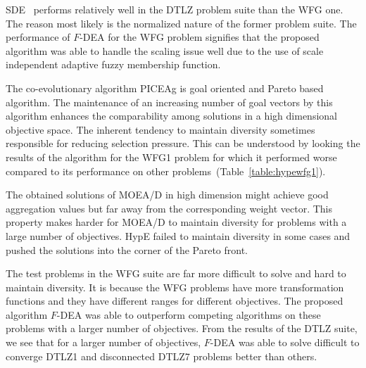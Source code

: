 \documentclass[review]{elsarticle}
\begin{document}
SDE~\citep{sdealgorithm} performs relatively well in the DTLZ problem suite than the WFG one. The reason most likely is the normalized nature of 
the former problem suite. 
The performance of $F$-DEA for the WFG problem signifies that the proposed algorithm was able to handle the scaling 
issue well due to the use of scale independent adaptive fuzzy membership function.

The co-evolutionary algorithm PICEAg is goal oriented and Pareto based algorithm. The maintenance of an increasing number of goal vectors
by this algorithm enhances the comparability among solutions in a high dimensional objective space. 
The inherent tendency to maintain diversity sometimes responsible for reducing selection pressure.
This can be understood by looking the results of the algorithm for the WFG1 problem for which it performed worse
compared to its performance on other problems~(Table~\ref{table:hypewfg1}).

The obtained solutions of MOEA/D in high dimension might achieve good aggregation values but far away from the corresponding weight vector. This property makes harder for MOEA/D to maintain diversity for problems with a large number of objectives. 
HypE failed to maintain diversity in some cases and pushed the solutions into the corner of the Pareto front.

The test problems in the WFG suite are far more difficult to solve and hard to maintain diversity. It is  because the WFG problems have more 
transformation functions and they have different ranges for different objectives. 
The proposed algorithm $F$-DEA was able to outperform competing algorithms on these problems
with a larger number of objectives.
From the results of the DTLZ suite, we  see that for a larger number of objectives, $F$-DEA was able to solve difficult 
to converge DTLZ1 and disconnected DTLZ7 problems better than others. 



%
%
%
\end{document}
